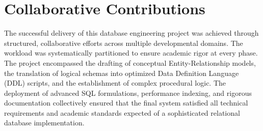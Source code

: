 \documentclass[../report_main.tex]{subfiles}
\begin{document}
\section{Collaborative Contributions}
The successful delivery of this database engineering project was achieved through structured, collaborative efforts across multiple developmental domains. The workload was systematically partitioned to ensure academic rigor at every phase. The project encompassed the drafting of conceptual Entity-Relationship models, the translation of logical schemas into optimized Data Definition Language (DDL) scripts, and the establishment of complex procedural logic. The deployment of advanced SQL formulations, performance indexing, and rigorous documentation collectively ensured that the final system satisfied all technical requirements and academic standards expected of a sophisticated relational database implementation.
\end{document}
